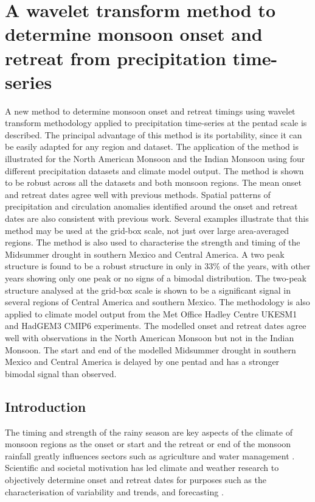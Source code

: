 \chapter{\label{ch:5-msd}A wavelet transform method to determine monsoon onset and retreat from precipitation time-series}

A new method to determine monsoon onset and retreat timings using wavelet transform methodology applied to precipitation time-series at the pentad scale is described.  The principal advantage of this method is its portability, since it can be easily adapted for any region and dataset. The application of the method is illustrated for the North American Monsoon and the Indian Monsoon using four different precipitation datasets and climate model output. The  method is shown to be robust across all the datasets and both monsoon regions. The mean onset and retreat dates  agree well with previous methods.  Spatial patterns of precipitation and circulation anomalies identified around the onset and retreat dates are also consistent with previous work. Several examples illustrate that this method may be used at the grid-box scale, not just over large area-averaged regions.
The method is also used to characterise the strength and timing of the Midsummer drought in southern Mexico and Central America.
A two peak structure is found to be a robust structure in only in 33\% of the years, with other years showing only one peak or no signs of a bimodal distribution. The two-peak structure analysed at the grid-box scale is shown to be a significant signal in several regions of Central America and southern Mexico. The methodology is also applied to climate model output from the Met Office Hadley Centre UKESM1 and HadGEM3 CMIP6 experiments. The modelled onset and retreat dates agree well with observations in the North American Monsoon but not in the Indian Monsoon. The start and end of the modelled Midsummer drought in southern Mexico and Central America is delayed by one pentad and has a stronger bimodal signal than observed.

\section{Introduction}

The timing and strength of the rainy season are key aspects of the climate of monsoon regions as the onset or start and the retreat or end of the monsoon rainfall greatly influences sectors such as agriculture \citep{sultan2005,Gadgil2006,jain2015,harvey2018} and water management \citep{turner2012,bussman2016}.
Scientific and societal motivation has led climate and weather research to objectively determine  onset and retreat dates for purposes such as the characterisation of variability and trends, and forecasting \citep[e.g.][]{kitoh2006,cook2009,picher,nieto2011,htway2011}. 

